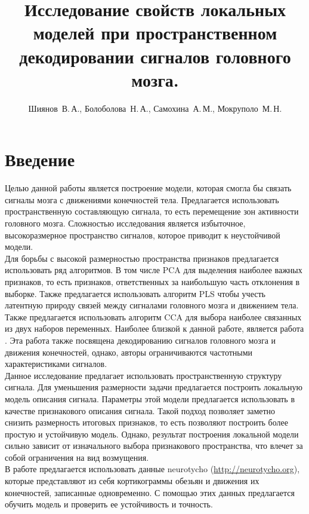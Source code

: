 \documentclass[12pt,twoside]{article}
\title
    [Локальные модели при декодировании сигналов головного мозга]
    {Исследование свойств локальных моделей при пространственном декодировании сигналов головного мозга.}
\author
    [Шиянов~В.\,А.]
    {Шиянов~В.\,А., Болоболова~Н.\,А., Самохина~А.\,М., Мокруполо~М.\,Н.}
\begin{document}
\maketitle
\section{Введение}
Целью данной работы является построение модели, которая смогла бы связать сигналы мозга с движениями конечностей тела. Предлагается использовать пространственную составляющую сигнала, то есть перемещение зон активности головного мозга. Сложностью исследования является избыточное, высокоразмерное пространство сигналов, которое приводит к неустойчивой модели.\\
Для борьбы с высокой размерностью пространства признаков предлагается использовать ряд алгоритмов. В том числе PCA \cite{Jolliffe2011} для выделения наиболее важных признаков, то есть признаков, ответственных за наибольшую часть отклонения в выборке. Также предлагается использовать алгоритм PLS \cite{Haenlein2004} чтобы учесть латентную природу связей между сигналами головного мозга и движением тела. Также предлагается использовать алгоритм CCA \cite{thompson2005canonical} для выбора наиболее связанных из двух наборов переменных. Наиболее близкой к данной работе, является работа \cite{Motrenko_2018}. Эта работа также посвящена декодированию сигналов головного мозга и движения конечностей, однако, авторы ограничиваются частотными характеристиками сигналов.\\
Данное исследование предлагает использовать пространственную структуру сигнала. Для уменьшения размерности задачи предлагается построить локальную модель описания сигнала. Параметры этой модели предлагается использовать в качестве признакового описания сигнала. Такой подход позволяет заметно снизить размерность итоговых признаков, то есть позволяют построить более простую и устойчивую модель. Однако, результат построения локальной модели сильно зависит от изначального выбора признакового пространства, что влечет за собой ограничения на вид возмущения.\\
В работе предлагается использовать данные neurotycho (\url{http://neurotycho.org}), которые представляют из себя кортикограммы обезьян и движения их конечностей, записанные одновременно. С помощью этих данных предлагается обучить модель и проверить ее устойчивость и точность.



\end{document}
